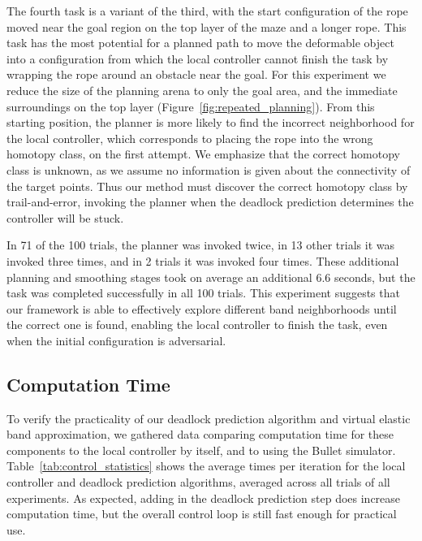 The fourth task is a variant of the third, with the start configuration of the rope moved near the goal region on the top layer of the maze and a longer rope. This task has the most potential for a planned path to move the deformable object into a configuration from which the local controller cannot finish the task by wrapping the rope around an obstacle near the goal. For this experiment we reduce the size of the planning arena to only the goal area, and the immediate surroundings on the top layer (Figure~\ref{fig:repeated_planning}). From this starting position, the planner is more likely to find the incorrect neighborhood for the local controller, which corresponds to placing the rope into the wrong homotopy class, on the first attempt. We emphasize that the correct homotopy class is unknown, as we assume no information is given about the connectivity of the target points. Thus our method must discover the correct homotopy class by trail-and-error, invoking the planner when the deadlock prediction determines the controller will be stuck.

In 71 of the 100 trials, the planner was invoked twice, in 13 other trials it was invoked three times, and in 2 trials it was invoked four times. These additional planning and smoothing stages took on average an additional 6.6 seconds, but the task was completed successfully in all 100 trials. This experiment suggests that our framework is able to effectively explore different band neighborhoods until the correct one is found, enabling the local controller to finish the task, even when the initial configuration is adversarial.




\subsection{Computation Time}




To verify the practicality of our deadlock prediction algorithm and virtual elastic band approximation, we gathered data comparing computation time for these components to the local controller by itself, and to using the Bullet simulator. Table~\ref{tab:control_statistics} shows the average times per iteration for the local controller and deadlock prediction algorithms, averaged across all trials of all experiments. As expected, adding in the deadlock prediction step does increase computation time, but the overall control loop is still fast enough for practical use.

